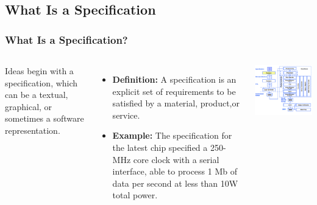 \documentclass[compress]{beamer}
\begin{document}
\subsection[Spec]{What Is a Specification}
\begin{frame}
	\frametitle{What Is a Specification?}
	\begin{columns}	
		Ideas begin with a specification, which can be a textual, graphical, or sometimes a software representation.
		\begin{itemize}
			\item \textbf{Definition:} A specification is an explicit set of requirements to be satisfied by a material, product,or service.
			\item \textbf{Example:} The specification for the latest chip specified a 250-MHz core clock with a serial interface, able to process 1 Mb of data per second at less than 10W total power.
		\end{itemize}
		\begin{center}
			\includegraphics[width=\textwidth]{spec}
		\end{center}
	\end{columns}
\end{frame}
\end{document}
